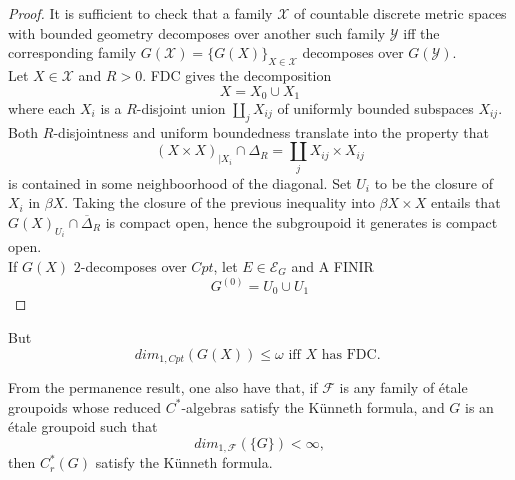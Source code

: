 \begin{proof}
It is sufficient to check that a family $\mathcal X$ of countable discrete metric spaces with bounded geometry decomposes over another such family $\mathcal Y$ iff the corresponding family $G(\mathcal X) = \{G(X)\}_{X\in \mathcal X}$ decomposes over $G(\mathcal Y)$.\\

Let $X\in \mathcal X$ and $R>0$. FDC gives the decomposition \[X = X_0 \cup X_1\]
where each $X_i$ is a $R$-disjoint union $\coprod_j X_{ij}$ of uniformly bounded subspaces $X_{ij}$. Both $R$-disjointness and uniform boundedness translate into the property that
\[(X\times X)_{|X_i} \cap \Delta_R =\coprod_j X_{ij} \times X_{ij}  \]   
is contained in some neighboorhood of the diagonal. Set $U_i$ to be the closure of $X_i$ in $\beta X$. Taking the closure of the previous inequality into $\beta X\times X$ entails that $G(X)_{U_i} \cap \overline \Delta_R$ is compact open, hence the subgroupoid it generates is compact open.\\

If $G(X)$ $2$-decomposes over $Cpt$, let $E\in \mathcal E_G$ and A FINIR
\[G^{(0)} = U_0 \cup U_1\] \end{proof}

But \[dim_{1,Cpt}(G(X))\leq \omega \text{ iff } X \text{ has FDC. } \]

From the permanence result, one also have that, if $\mathcal F$ is any family of \'etale groupoids whose reduced $C^*$-algebras satisfy the Künneth formula, and $G$ is an \'etale groupoid such that \[dim_{1, \mathcal F} ( \{G\} ) < \infty, \]
then $C_r^*(G)$ satisfy the Künneth formula.
































